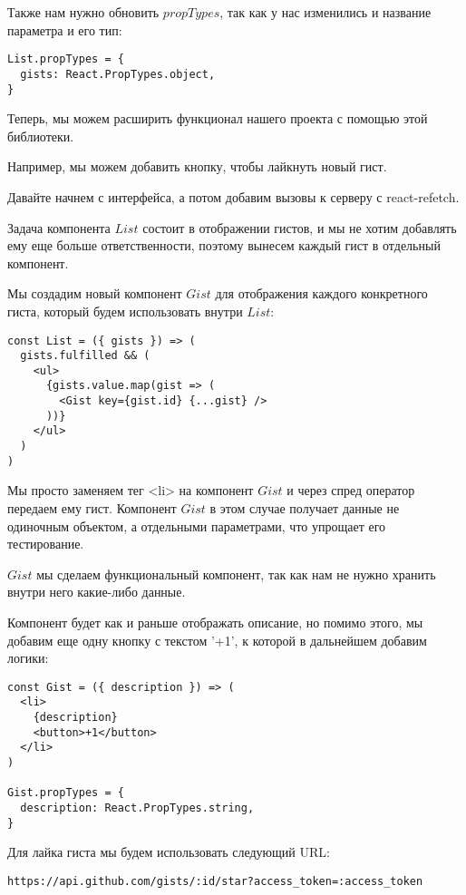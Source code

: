 Также нам нужно обновить $propTypes$, так как у нас изменились и название параметра и его тип:

\begin{lstlisting}
List.propTypes = {
  gists: React.PropTypes.object,
}
\end{lstlisting}

Теперь, мы можем расширить функционал нашего проекта с помощью этой библиотеки.

Например, мы можем добавить кнопку, чтобы лайкнуть новый гист.

Давайте начнем с интерфейса, а потом добавим вызовы к серверу с react-refetch.

Задача компонента $List$ состоит в отображении гистов, и мы не хотим добавлять ему еще больше ответственности, поэтому вынесем каждый гист в отдельный компонент.

Мы создадим новый компонент $Gist$ для отображения каждого конкретного гиста, который будем использовать внутри $List$:

\begin{lstlisting}
const List = ({ gists }) => (
  gists.fulfilled && (
    <ul>
      {gists.value.map(gist => (
        <Gist key={gist.id} {...gist} />
      ))}
    </ul>
  )
)
\end{lstlisting}

Мы просто заменяем тег <li> на компонент $Gist$ и через спред оператор передаем ему гист. Компонент $Gist$ в этом случае получает данные не одиночным объектом, а отдельными параметрами, что упрощает его тестирование.

$Gist$ мы сделаем функциональный компонент, так как нам не нужно хранить внутри него какие-либо данные.

Компонент будет как и раньше отображать описание, но помимо этого, мы добавим еще одну кнопку с текстом '+1', к которой в дальнейшем добавим логики:

\begin{lstlisting}
const Gist = ({ description }) => (
  <li>
    {description}
    <button>+1</button>
  </li>
)

Gist.propTypes = {
  description: React.PropTypes.string,
}
\end{lstlisting}

Для лайка гиста мы будем использовать следующий URL:

\begin{lstlisting}
https://api.github.com/gists/:id/star?access_token=:access_token
\end{lstlisting}

